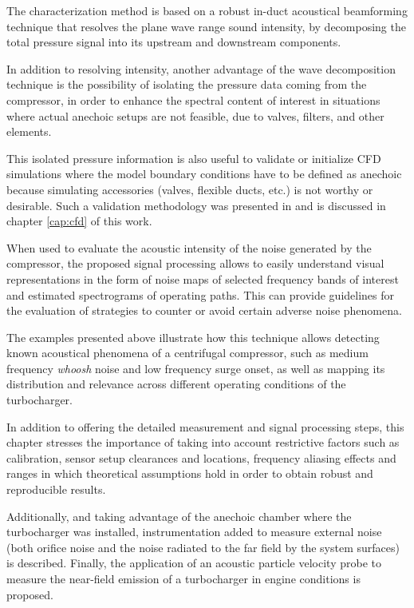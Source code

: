 The characterization method is based on a robust in-duct acoustical beamforming technique that resolves the plane wave range sound intensity, by decomposing the total pressure signal into its upstream and downstream components.

In addition to resolving intensity, another advantage of the wave decomposition technique is the possibility of isolating the pressure data coming from the compressor, in order to enhance the spectral content of interest in situations where actual anechoic setups are not feasible, due to valves, filters, and other elements.

This isolated pressure information is also useful to validate or initialize CFD simulations where the model boundary conditions have to be defined as anechoic because simulating accessories (valves, flexible ducts, etc.) is not worthy or desirable. Such a validation methodology was presented in \cite{broatch2014methodology} and is discussed in chapter \ref{cap:cfd} of this work.

When used to evaluate the acoustic intensity of the noise generated by the compressor, the proposed signal processing allows to easily  understand visual representations in the form of noise maps of selected frequency bands of interest and estimated spectrograms of operating paths. This can provide guidelines for the evaluation of strategies to counter or avoid certain adverse noise phenomena.

The examples presented above illustrate how this technique allows detecting known acoustical phenomena of a centrifugal compressor, such as medium frequency \emph{whoosh} noise and low frequency surge onset, as well as mapping its distribution and relevance across different operating conditions of the turbocharger.

In addition to offering the detailed measurement and signal processing steps, this chapter stresses the importance of taking into account restrictive factors such as calibration, sensor setup clearances and locations, frequency aliasing effects and ranges in which theoretical assumptions hold in order to obtain robust and reproducible results.

Additionally, and taking advantage of the anechoic chamber where the turbocharger was installed, instrumentation added to measure external noise (both orifice noise and the noise radiated to the far field by the system surfaces) is described. Finally, the application of an acoustic particle velocity probe to measure the near-field emission of a turbocharger in engine conditions is proposed.

